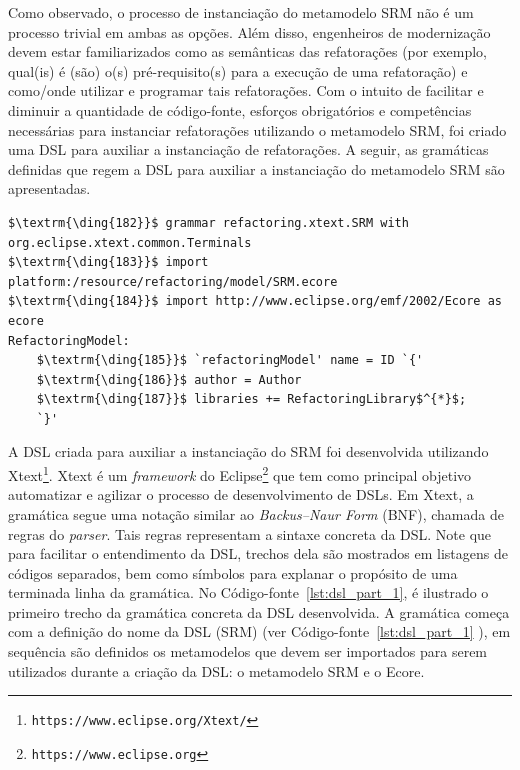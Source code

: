 Como observado, o processo de instanciação do metamodelo SRM não é um processo trivial em ambas as opções. Além disso, engenheiros de modernização devem estar familiarizados como as semânticas das refatorações (por exemplo, qual(is) é (são) o(s) pré-requisito(s) para a execução de uma refatoração) e como/onde utilizar e programar tais refatorações. Com o intuito de facilitar e diminuir a quantidade de código-fonte, esforços obrigatórios e competências necessárias para instanciar refatorações utilizando o metamodelo SRM, foi criado uma DSL para auxiliar a instanciação de refatorações. A seguir, as gramáticas definidas que regem a DSL para auxiliar a instanciação do metamodelo SRM são apresentadas.

\begin{lstlisting}[language=Xtext, frame=single, basicstyle={\scriptsize}, mathescape=true, label={lst:dsl_part_1}, caption={Gramática da DSL - parte 1}]
$\textrm{\ding{182}}$ grammar refactoring.xtext.SRM with org.eclipse.xtext.common.Terminals 
$\textrm{\ding{183}}$ import platform:/resource/refactoring/model/SRM.ecore
$\textrm{\ding{184}}$ import http://www.eclipse.org/emf/2002/Ecore as ecore
RefactoringModel: 
	$\textrm{\ding{185}}$ `refactoringModel' name = ID `{'
	$\textrm{\ding{186}}$ author = Author
	$\textrm{\ding{187}}$ libraries += RefactoringLibrary$^{*}$;
	`}'
\end{lstlisting}

%
%
A DSL criada para auxiliar a instanciação do SRM foi desenvolvida utilizando Xtext\footnote{\texttt{https://www.eclipse.org/Xtext/}}. Xtext é um \textit{framework} do Eclipse\footnote{\texttt{https://www.eclipse.org}} que tem como principal objetivo automatizar e agilizar o processo de desenvolvimento de DSLs. %
%
Em Xtext, a gramática segue uma notação similar ao \textit{Backus–Naur Form} (BNF), chamada de regras do \textit{parser}. Tais regras representam a sintaxe concreta da DSL. Note que para facilitar o entendimento da DSL, trechos dela são mostrados em listagens de códigos separados, bem como símbolos para explanar o propósito de uma terminada linha da gramática. No Código-fonte~\ref{lst:dsl_part_1}, é ilustrado o primeiro trecho da gramática concreta da DSL desenvolvida. A gramática começa com a definição do nome da DSL (SRM) (ver Código-fonte~\ref{lst:dsl_part_1} ), em sequência são definidos os metamodelos que devem ser importados para serem utilizados durante a criação da DSL: o metamodelo SRM e o Ecore.


